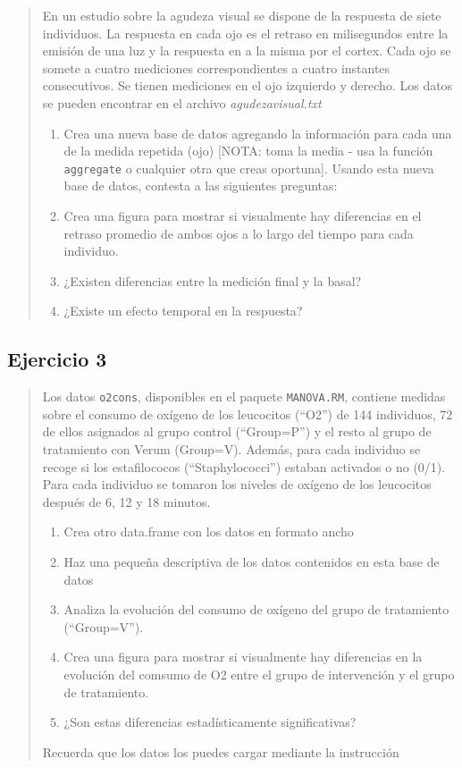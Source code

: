 \documentclass[
]{book}
\providecommand{\tightlist}{%
  \setlength{\itemsep}{0pt}\setlength{\parskip}{0pt}}
\begin{document}
\begin{quote}
En un estudio sobre la agudeza visual se dispone de la respuesta de siete individuos. La respuesta en cada ojo es el retraso en milisegundos entre la emisión de una luz y la respuesta en a la misma por el cortex. Cada ojo se somete a cuatro mediciones correspondientes a cuatro instantes consecutivos. Se tienen mediciones en el ojo izquierdo y derecho. Los datos se pueden encontrar en el archivo \emph{agudezavisual.txt}

\begin{enumerate}
\def\labelenumi{\arabic{enumi}.}
\tightlist
\item
  Crea una nueva base de datos agregando la información para cada una de la medida repetida (ojo) {[}NOTA: toma la media - usa la función \texttt{aggregate} o cualquier otra que creas oportuna{]}. Usando esta nueva base de datos, contesta a las siguientes preguntas:
\item
  Crea una figura para mostrar si visualmente hay diferencias en el retraso promedio de ambos ojos a lo largo del tiempo para cada individuo.
\item
  ¿Existen diferencias entre la medición final y la basal?
\item
  ¿Existe un efecto temporal en la respuesta?
\end{enumerate}
\end{quote}

\hypertarget{ejercicio-3}{%
\subsection{Ejercicio 3}\label{ejercicio-3}}

\begin{quote}
Los datos \texttt{o2cons}, disponibles en el paquete \texttt{MANOVA.RM}, contiene medidas sobre el consumo de oxígeno de los leucocitos (``O2'') de 144 individuos, 72 de ellos asignados al grupo control (``Group=P'') y el resto al grupo de tratamiento con Verum (Group=V). Además, para cada individuo se recoge si los estafilococos (``Staphylococci'') estaban activados o no (0/1). Para cada individuo se tomaron los niveles de oxígeno de los leucocitos después de 6, 12 y 18 minutos.

\begin{enumerate}
\def\labelenumi{\arabic{enumi}.}
\tightlist
\item
  Crea otro data.frame con los datos en formato ancho
\item
  Haz una pequeña descriptiva de los datos contenidos en esta base de datos
\item
  Analiza la evolución del consumo de oxígeno del grupo de tratamiento (``Group=V'').
\item
  Crea una figura para mostrar si visualmente hay diferencias en la evolución del comsumo de O2 entre el grupo de intervención y el grupo de tratamiento.
\item
  ¿Son estas diferencias estadísticamente significativas?
\end{enumerate}

Recuerda que los datos los puedes cargar mediante la instrucción
\end{quote}
\end{document}
